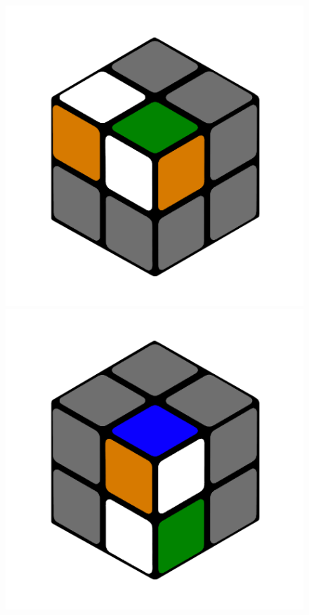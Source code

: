 \documentclass[12pt,a4paper]{article}
\theoremstyle{custom}
\begin{document}
\begin{figure}[H]
\centering
\includegraphics[scale=0.16]{e1_s2_s1_s.png}
\includegraphics[scale=0.16]{e1_s2_s2_s.png}

\end{figure}
\end{document}
